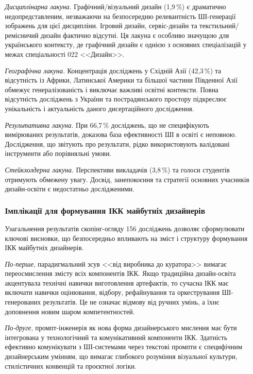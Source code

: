 \textit{Дисциплінарна лакуна.} Графічний/візуальний дизайн (1,9\,\%) є драматично недопредставленим, незважаючи на безпосередню релевантність ШІ-генерації зображень для цієї дисципліни. Ігровий дизайн, сервіс-дизайн та текстильний/ремісничий дизайн фактично відсутні. Ця лакуна є особливо значущою для українського контексту, де графічний дизайн є однією з основних спеціалізацій у межах спеціальності 022 <<Дизайн>>.

\textit{Географічна лакуна.} Концентрація досліджень у Східній Азії (42,3\,\%) та відсутність із Африки, Латинської Америки та більшої частини Південної Азії обмежує генералізованість і виключає важливі освітні контексти. Повна відсутність досліджень з України та пострадянського простору підкреслює унікальність і актуальність даного дисертаційного дослідження.

\textit{Результативна лакуна.} При 66,7\,\% досліджень, що не специфікують вимірюваних результатів, доказова база ефективності ШІ в освіті є неповною. Дослідження, що звітують про результати, рідко використовують валідовані інструменти або порівняльні умови.

\textit{Стейкхолдерна лакуна.} Перспективи викладачів (3,8\,\%) та голоси студентів отримують обмежену увагу. Досвід, занепокоєння та стратегії основних учасників дизайн-освіти є недостатньо дослідженими.

\subsubsection{Імплікації для формування ІКК майбутніх дизайнерів}\label{sssec:1.2.15}

Узагальнення результатів скопінг-огляду 156 досліджень дозволяє сформулювати ключові висновки, що безпосередньо впливають на зміст і структуру формування ІКК майбутніх дизайнерів.

\textit{По-перше}, парадигмальний зсув <<від виробника до куратора>> вимагає переосмислення змісту всіх компонентів ІКК. Якщо традиційна дизайн-освіта акцентувала технічні навички виготовлення артефактів, то сучасна ІКК має включати навички оцінювання, відбору, рефайнування та оркестрування ШІ-генерованих результатів. Це не означає відмову від ручних умінь, а їхнє доповнення новим шаром компетентностей.

\textit{По-друге}, промпт-інженерія як нова форма дизайнерського мислення має бути інтегрована у технологічний та комунікативний компоненти ІКК. Здатність ефективно комунікувати з ШІ-системами через текстові промпти є специфічним дизайнерським умінням, що вимагає глибокого розуміння візуальної культури, стилістичних конвенцій та проєктної логіки.


